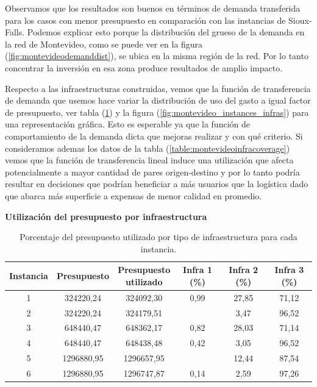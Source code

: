\documentclass{article}
\begin{document}
  Observamos que los resultados son buenos en términos de demanda transferida para los casos con menor presupuesto en comparación con las instancias de Sioux-Falls. Podemos explicar esto porque la distribución del grueso de la demanda en la red de Montevideo, como se puede ver en la figura (\ref{fig:montevideodemanddist}), se ubica en la misma región de la red. Por lo tanto concentrar la inversión en esa zona produce resultados de amplio impacto.

  Respecto a las infraestructuras construidas, vemos que la función de transferencia de demanda que usemos hace variar la distribución de uso del gasto a igual factor de presupuesto, ver tabla (\ref{table:montevideobudgetusage}) y la figura (\ref{fig:montevideo_instances_infras}) para una representación gráfica. Esto es esperable ya que la función de comportamiento de la demanda dicta que mejoras realizar y con qué criterio. Si consideramos ademas los datos de la tabla (\ref{table:montevideoinfracoverage}) vemos que la función de transferencia lineal induce una utilización que afecta potencialmente a mayor cantidad de pares origen-destino y por lo tanto podría resultar en decisiones que podrían beneficiar a más usuarios que la logística dado que abarca más superficie a expensas de menor calidad en promedio.

  \begin{table}[h!]
    \centering
    \caption*{{\bf Utilización del presupuesto por infraestructura}}
    \begin{tabular}{cccccc}
      \toprule
        Instancia & Presupuesto & \shortstack{Presupuesto \\ utilizado} & Infra 1 (\%) & Infra 2 (\%) & Infra 3 (\%) \\
      \midrule
        1 & 324220,24 & 324092,30 & 0,99 & 27,85 & 71,12 \\
        2 & 324220,24 & 324179,51 &  & 3,47 & 96,52 \\
        3 & 648440,47 & 648362,17 & 0,82 & 28,03 & 71,14 \\
        4 & 648440,47 & 648438,48 & 0,42 & 3,05 & 96,52 \\
        5 & 1296880,95 & 1296657,95 &  & 12,44 & 87,54 \\
        6 & 1296880,95 & 1296747,87 & 0,14 & 2,59 & 97,26 \\
      \bottomrule
    \end{tabular}
      \caption{Porcentaje del presupuesto utilizado por tipo de infraestructura para cada instancia.}\label{table:montevideobudgetusage}
  \end{table}
\end{document}
